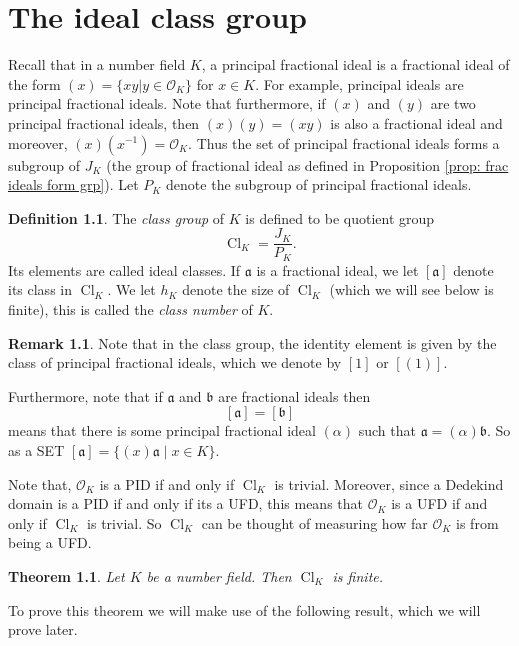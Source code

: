 \documentclass[11pt,a4paper]{report}
\theoremstyle{plain}
\newtheorem{thm}[subsection]{Theorem}
\theoremstyle{definition}
\newtheorem{defn}[subsection]{Definition}
\theoremstyle{definition}
\newtheorem*{rmrk*}{Remark}
\def\gothb{\mathfrak{b}}
\def \a{\alpha}
\def \OO {\mathcal{O}}
\def\gotha{\mathfrak{a}}
\DeclareMathOperator{\Cl}{Cl}
\begin{document}
\chapter{The ideal class group}



Recall that in a number field $K$, a principal fractional ideal is a fractional ideal of the form $(x)=\{xy| y \in \OO_K\}$ for $x \in K$. For example, principal ideals are principal fractional ideals. Note that furthermore, if $(x)$ and $(y)$ are two principal fractional ideals, then $(x)(y)=(xy)$ is also a fractional ideal and moreover, $(x)(x^{-1})=\OO_K$. Thus the set of principal fractional ideals forms a subgroup of $J_K$ (the group of fractional ideal as defined in Proposition \ref{prop: frac ideals form grp}). Let $P_K$ denote the subgroup of principal fractional ideals.

\begin{defn}
	The \textit{class group} of $K$ is defined to be quotient group \[\Cl_K=\frac{J_K}{P_K}. \] Its elements are called ideal classes. If $\gotha$ is a fractional ideal, we let $[\gotha]$ denote its class in $\Cl_K$. We let $h_K$ denote the size of $\Cl_K$ (which we will see below is finite), this is called the \textit{class number} of $K$. 
\end{defn}


\begin{rmrk*}
	Note that in the class group, the identity element is given by the class of principal fractional ideals, which we denote by $[1]$ or $[(1)]$. 
	
	Furthermore, note that if $\gotha$ and $\gothb$ are fractional ideals then \[[\gotha]=[\gothb]\] means that there is some principal fractional ideal $(\a)$ such that $\gotha=(\a)\gothb$. So as a SET $[\gotha]=\{(x)\gotha \mid x \in K\}$.
\end{rmrk*}

Note that,  $\OO_K$ is a PID if and only if  $\Cl_K$ is trivial. Moreover, since a Dedekind domain is a PID if and only if its a UFD, this means that $\OO_K$ is a UFD if and only if $\Cl_K$ is trivial. So $\Cl_K$ can be thought of measuring how far $\OO_K$ is from being a UFD. 

\begin{thm}\label{thm: cls grp fin}
	Let $K$ be a number field. Then $\Cl_K$ is finite.
\end{thm}

To prove this theorem we will make use of the following result, which we will prove later.
\end{document}
